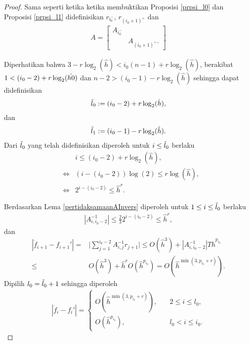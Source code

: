 \begin{proof}
    Sama seperti ketika ketika membuktikan Proposisi \ref{prpsi_l0} dan Proposisi \ref{prpsi_l1} didefinisikan $r_{i_0^-}$, $r_{(i_0 + 1)^+}$ dan 
    \begin{align*}
        A = \begin{bmatrix}
            A_{i_0^-} & \\
            & A_{(i_0+1)^+}.
        \end{bmatrix}
    \end{align*}

    Diperhatikan bahwa $3 - r \log_2(\hat{h}) < i_0 (n-1) + r\log_2(\hat{h})$, berakibat $\\1 < (i_0 - 2) + r\log_2(\hat{h0})$ dan $n-2> (i_0 - 1) - r\log_2(\hat{h})$ sehingga dapat didefinisikan
    \begin{align*}
        \Tilde{l}_0:=(i_0 - 2) + r\log_2(\hat{h}),
    \end{align*}
    dan
    \begin{align*}
        \Tilde{l}_1:=(i_0 - 1) - r\log_2(\hat{h}).
    \end{align*}
    Dari $\Tilde{l}_0$ yang telah didefinisikan diperoleh untuk $i \leq \Tilde{l}_0$ berlaku
    \begin{align*}
        && i \leq (i_0 - 2) + r\log_2(\hat{h}), \\
        &\Leftrightarrow& (i - (i_0 - 2))\log(2) \leq r\log(\hat{h}), \\
        &\Leftrightarrow& 2^{i - (i_0 - 2)} \leq \hat{h}^r.
    \end{align*}
    
     Berdasarkan Lema \ref{pertidaksamaanAInvers} diperoleh untuk $1 \leq i \leq \Tilde{l}_0$ berlaku 
    \begin{align*}
        |A_{i,{i_0-2}}^{-1}| \leq \frac{2}{3}2^{i-(i_0 - 2)} \leq \hat{h}^r,
    \end{align*}
    dan 
    \begin{align*}
        |\dot{f}_{i+1} - f_{i+1}'| =& \Bigg| \sum_{j=1}^{i_0 - 2} A_{i,j}^{-1}r_{j+1} \Bigg| \leq O(\hat{h}^3) + |A_{i,{i_0-2}}^{-1}|T\hat{h}^{p_{i_0}} \\
        \leq& O(\hat{h}^3) + \hat{h}^rO(\hat{h}^{p_{i_0}}) = O(\hat{h}^{\min(3,p_{i_0}+r)}).
    \end{align*}
    Dipilih $l_0 = \Tilde{l}_0 + 1$ sehingga diperoleh
    \begin{align*}
        |\dot{f}_i - f_i'|=\begin{cases}
            O(\hat{h}^{\min(3,p_{i_0}+r)}), \quad &2\leq i\leq l_0,\\
            O(\hat{h}^{p_{i_0}}), \quad &l_0<i\leq i_0.
        \end{cases}
    \end{align*}


\end{proof}
